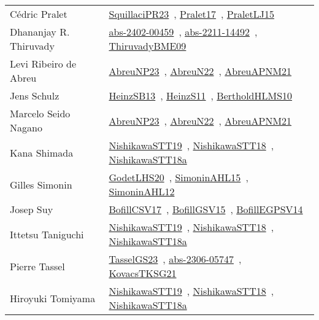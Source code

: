 {\begin{longtable}{p{4cm}p{20cm}}
C{\'{e}}dric Pralet & \href{papers/SquillaciPR23.pdf}{SquillaciPR23}~\cite{SquillaciPR23}, \href{papers/Pralet17.pdf}{Pralet17}~\cite{Pralet17}, \href{papers/PraletLJ15.pdf}{PraletLJ15}~\cite{PraletLJ15}\\
Dhananjay R. Thiruvady & \href{articles/abs-2402-00459.pdf}{abs-2402-00459}~\cite{abs-2402-00459}, \href{articles/abs-2211-14492.pdf}{abs-2211-14492}~\cite{abs-2211-14492}, \href{papers/ThiruvadyBME09.pdf}{ThiruvadyBME09}~\cite{ThiruvadyBME09}\\
Levi Ribeiro de Abreu & \href{}{AbreuNP23}~\cite{AbreuNP23}, \href{articles/AbreuN22.pdf}{AbreuN22}~\cite{AbreuN22}, \href{}{AbreuAPNM21}~\cite{AbreuAPNM21}\\
Jens Schulz & \href{articles/HeinzSB13.pdf}{HeinzSB13}~\cite{HeinzSB13}, \href{papers/HeinzS11.pdf}{HeinzS11}~\cite{HeinzS11}, \href{papers/BertholdHLMS10.pdf}{BertholdHLMS10}~\cite{BertholdHLMS10}\\
Marcelo Seido Nagano & \href{}{AbreuNP23}~\cite{AbreuNP23}, \href{articles/AbreuN22.pdf}{AbreuN22}~\cite{AbreuN22}, \href{}{AbreuAPNM21}~\cite{AbreuAPNM21}\\
Kana Shimada & \href{}{NishikawaSTT19}~\cite{NishikawaSTT19}, \href{papers/NishikawaSTT18.pdf}{NishikawaSTT18}~\cite{NishikawaSTT18}, \href{papers/NishikawaSTT18a.pdf}{NishikawaSTT18a}~\cite{NishikawaSTT18a}\\
Gilles Simonin & \href{papers/GodetLHS20.pdf}{GodetLHS20}~\cite{GodetLHS20}, \href{articles/SimoninAHL15.pdf}{SimoninAHL15}~\cite{SimoninAHL15}, \href{papers/SimoninAHL12.pdf}{SimoninAHL12}~\cite{SimoninAHL12}\\
Josep Suy & \href{papers/BofillCSV17.pdf}{BofillCSV17}~\cite{BofillCSV17}, \href{papers/BofillGSV15.pdf}{BofillGSV15}~\cite{BofillGSV15}, \href{papers/BofillEGPSV14.pdf}{BofillEGPSV14}~\cite{BofillEGPSV14}\\
Ittetsu Taniguchi & \href{}{NishikawaSTT19}~\cite{NishikawaSTT19}, \href{papers/NishikawaSTT18.pdf}{NishikawaSTT18}~\cite{NishikawaSTT18}, \href{papers/NishikawaSTT18a.pdf}{NishikawaSTT18a}~\cite{NishikawaSTT18a}\\
Pierre Tassel & \href{papers/TasselGS23.pdf}{TasselGS23}~\cite{TasselGS23}, \href{articles/abs-2306-05747.pdf}{abs-2306-05747}~\cite{abs-2306-05747}, \href{papers/KovacsTKSG21.pdf}{KovacsTKSG21}~\cite{KovacsTKSG21}\\
Hiroyuki Tomiyama & \href{}{NishikawaSTT19}~\cite{NishikawaSTT19}, \href{papers/NishikawaSTT18.pdf}{NishikawaSTT18}~\cite{NishikawaSTT18}, \href{papers/NishikawaSTT18a.pdf}{NishikawaSTT18a}~\cite{NishikawaSTT18a}\\

\end{longtable}}
